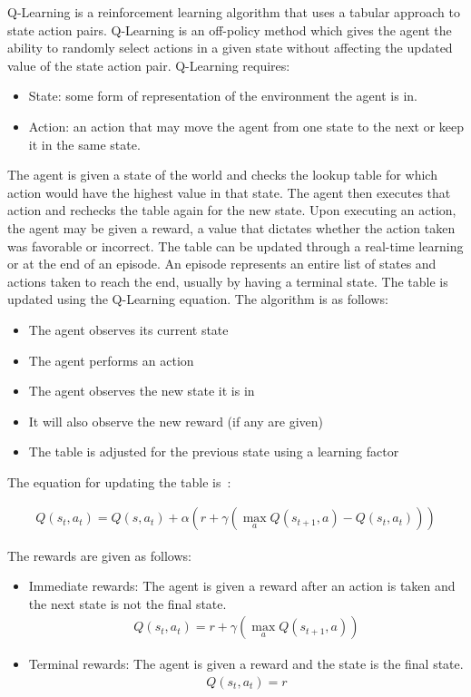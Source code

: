 Q-Learning is a reinforcement learning algorithm that uses a tabular approach to
state action pairs. Q-Learning is an off-policy method which gives the agent the
ability to randomly select actions in a given state without affecting the
updated value of the state action pair. Q-Learning requires:

\begin{itemize}
    \item State: some form of representation of the environment the agent is in.
    \item Action: an action that may move the agent from one state to the next
        or keep it in the same state.
\end{itemize}

The agent is given a state of the world and checks the lookup table for which
action would have the highest value in that state. The agent then executes that
action and rechecks the table again for the new state. Upon executing an action,
the agent may be given a reward, a value that dictates whether the action taken
was favorable or incorrect. The table can be updated through a real-time
learning or at the end of an episode. An episode represents an entire list of
states and actions taken to reach the end, usually by having a terminal state.
The table is updated using the Q-Learning equation. The algorithm is as follows:

\begin{itemize}
    \item The agent observes its current state
    \item The agent performs an action
    \item The agent observes the new state it is in
    \item It will also observe the new reward (if any are given)
    \item The table is adjusted for the previous state using a learning factor
\end{itemize}

The equation for updating the table is~\cite{watkins1992q}:

\begin{align}
    Q(s_t,a_t) = Q(s,a_t) + \alpha (r + \gamma (\max_a Q(s_{t+1}, a) - Q(s_t,a_t)))
\end{align}

The rewards are given as follows:

\begin{itemize}
    \item Immediate rewards: The agent is given a reward after an action is
        taken and the next state is not the final state.
        \begin{align} \label{eq:q_update}
            Q(s_t,a_t) = r + \gamma (\max_a Q(s_{t+1}, a))
        \end{align}
    \item Terminal rewards: The agent is given a reward and the state is the
        final state.
        \begin{align}
            Q(s_t,a_t) = r
        \end{align}
\end{itemize}

